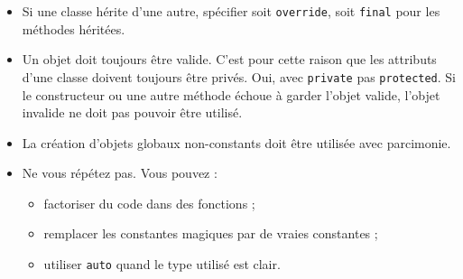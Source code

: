 \documentclass[12pt,a4paper]{article}
\begin{document}
\begin{itemize}
\item Si une classe hérite d'une autre, spécifier soit \lstinline|override|, soit \lstinline|final| pour les méthodes héritées.
\item Un objet doit toujours être valide. C'est pour cette raison que les attributs d'une classe doivent toujours être privés. Oui, avec \lstinline|private| pas \lstinline|protected|. Si le constructeur ou une autre méthode échoue à garder l'objet valide, l'objet invalide ne doit pas pouvoir être utilisé.
\item La création d'objets globaux non-constants doit être utilisée avec parcimonie.
\item Ne vous répétez pas. Vous pouvez :
	\begin{itemize}
	\item factoriser du code dans des fonctions ;
	\item remplacer les \og constantes magiques \fg{} par de vraies constantes ;
	\item utiliser \lstinline|auto| quand le type utilisé est clair.
	\end{itemize}
\end{itemize}
\end{document}
